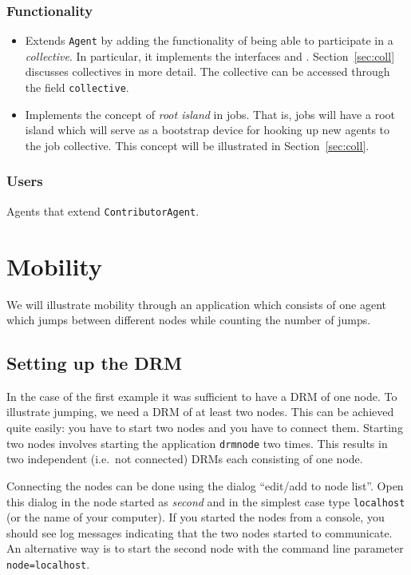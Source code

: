\documentclass{article}
\begin{document}
\subsubsection{Functionality}

\begin{itemize}
\item Extends {\tt Agent} by adding the functionality of being able to
participate in a {\em collective}.
In particular, it implements the interfaces
and
.
Section~\ref{sec:coll} discusses collectives in more detail.
The collective can be accessed through the field {\tt collective}.
\item Implements the concept of {\em root island} in jobs.
That is, jobs will
have a root island which will serve as a bootstrap device for hooking
up new agents to the job collective.
This concept will be illustrated in Section~\ref{sec:coll}.
\end{itemize}

\subsubsection{Users}

Agents that extend {\tt ContributorAgent}.

\section{Mobility}
\label{sec:mobil}

We will illustrate mobility through an application which consists of one
agent which jumps between different nodes while counting the number of jumps.

\subsection{Setting up the DRM}
\label{sec:mobil_drm}

In the case of the first example it was sufficient to have a DRM of one node.
To illustrate jumping, we need a DRM of at least two nodes.
This can be achieved quite easily: you have to start two nodes and you have
to connect them.
Starting two nodes involves starting the application {\tt drmnode} two times.
This results in two independent (i.e.\ not connected)
DRMs each consisting of one node.

Connecting the nodes can be done using the dialog ``edit/add to node list''.
Open this dialog in the node started as {\em second} and in the simplest case
type {\tt localhost} (or the name of your computer).
If you started the nodes from a console, you should see log messages indicating
that the two nodes started to communicate.
An alternative way is to start the second node with the command line
parameter {\tt node=localhost}.
\end{document}
